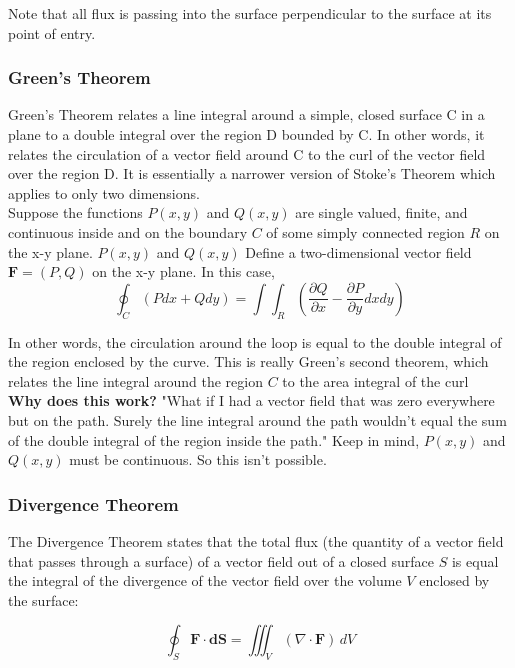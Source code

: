 \documentclass[12pt]{article}
\begin{document}
Note that all flux is passing into the surface perpendicular to the surface at its point of entry.\\

\subsubsection{Green's Theorem}
Green's Theorem relates a line integral around a simple, closed surface C in a plane to a double integral over the region D bounded by C. In other words, it relates the circulation of a vector field around C to the curl of the vector field over the region D. It is essentially a narrower version of Stoke's Theorem which applies to only two dimensions. \\

Suppose the functions \(P(x,y)\) and  \(Q(x,y)\) are single valued, finite, and continuous inside and on the boundary \(C\) of some simply connected region \(R\) on the x-y plane.  \(P(x,y)\) and  \(Q(x,y)\) Define a two-dimensional vector field \(\mathbf{F} = (P,Q)\) on the x-y plane. In this case,
\[\oint_C (Pdx + Qdy) = \int \int_R (\frac{\partial Q}{\partial x} - \frac{\partial P}{\partial y} dx dy)\]

In other words, the circulation around the loop is equal to the double integral of the region enclosed by the curve. This is really Green's second theorem, which relates the line integral around the region \(C\) to the area integral of the curl\\

\textbf{Why does this work?} "What if I had a vector field that was zero everywhere but on the path. Surely the line integral around the path wouldn't equal the sum of the double integral of the region inside the path." Keep in mind,  \(P(x,y)\) and  \(Q(x,y)\)  must be continuous. So this isn't possible. 

\subsubsection{Divergence Theorem}

The Divergence Theorem states that the total flux (the quantity of a vector field that passes through a surface) of a vector field out of a closed surface \( S \) is equal the integral of the divergence of the vector field over the volume \( V \) enclosed by the surface:

\[
\oint_S \mathbf{F} \cdot \mathbf{dS} = \iiint_V (\nabla \cdot \mathbf{F}) \, dV
\]
\end{document}
